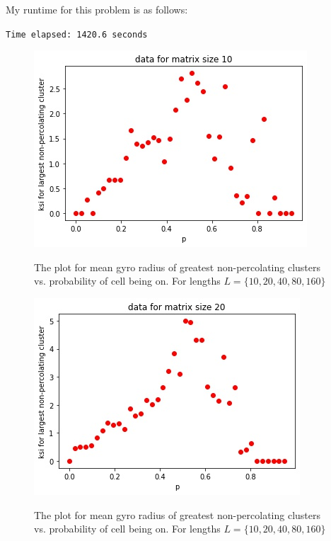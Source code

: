\documentclass[12pt]{article}
\begin{document}
	My runtime for this problem is as follows:\\
	\centerline{\texttt{Time elapsed: 1420.6 seconds}}
	\begin{figure}[h!]
		\centering
		\includegraphics[width=0.9\linewidth]{../p5/fig0.jpg}
		\label{fig:gyroCluster}
		\caption{The plot for mean gyro radius  of greatest non-percolating clusters vs. probability of cell being on. For lengths $L = \{10, 20, 40, 80, 160\}$}
	\end{figure}
	\begin{figure}[h!]
	\centering
		\includegraphics[width=0.9\linewidth]{../p5/fig1.jpg}
	\label{fig:gyroCluste1}
	\caption{The plot for mean gyro radius  of greatest non-percolating clusters vs. probability of cell being on. For lengths $L = \{10, 20, 40, 80, 160\}$}
\end{figure}
\end{document}
